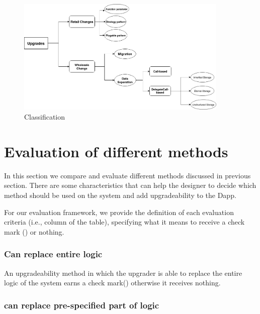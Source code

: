 \begin{figure}
  \centering
    
      \includegraphics[width=0.9\textwidth]{figures/Chart.png}
  \caption{Classification}
 \end{figure}

 \section{Evaluation of different methods}
 
 In this section we compare and evaluate different methods discussed in previous section. There are some characteristics that can help the designer to decide which method should be used on the system and add upgradeability to the Dapp.

 For our evaluation framework, we provide the definition of each evaluation criteria (i.e., column of the table), specifying what it means to receive a check mark (\checkmark) or nothing.

 
 
 
\subsubsection{Can replace entire logic}

An upgradeability method in which the upgrader is able to replace the entire logic of the system earns a check mark(\checkmark) otherwise it receives nothing.

\subsubsection{can replace pre-specified part of logic}

